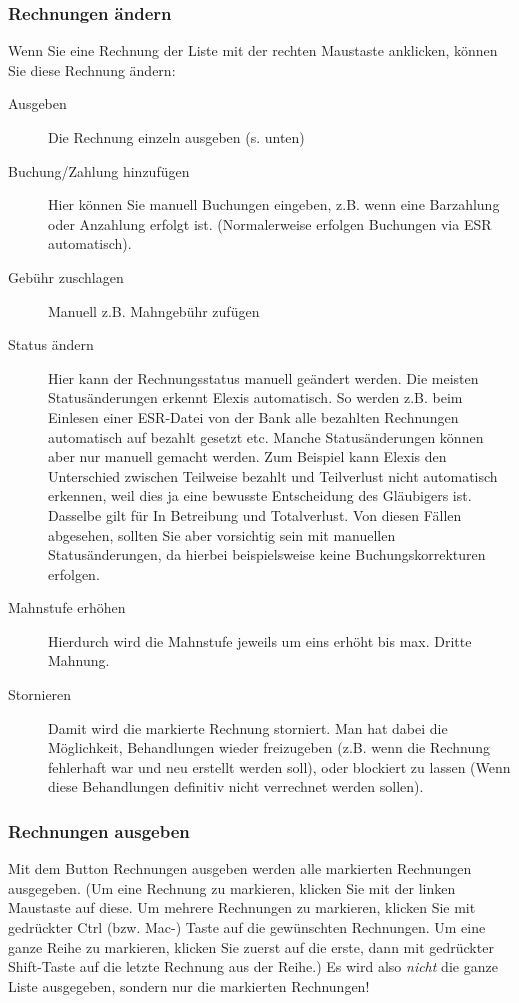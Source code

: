\subsubsection{Rechnungen ändern}
Wenn Sie eine Rechnung der Liste mit der rechten Maustaste anklicken, können Sie diese Rechnung ändern:
\begin{description}
\item [Ausgeben] Die Rechnung einzeln ausgeben (s. unten)
\item [Buchung/Zahlung hinzufügen] Hier können Sie manuell Buchungen eingeben, z.B. wenn eine Barzahlung oder Anzahlung erfolgt ist. (Normalerweise erfolgen Buchungen via ESR automatisch).
\item [Gebühr zuschlagen] Manuell z.B. Mahngebühr zufügen
\item [Status ändern] Hier kann der Rechnungsstatus manuell geändert werden. Die meisten Statusänderungen erkennt Elexis automatisch. So werden z.B. beim Einlesen einer ESR-Datei von der Bank alle bezahlten Rechnungen automatisch auf \glqq bezahlt\grqq{} gesetzt etc. Manche Statusänderungen können aber nur manuell gemacht werden. Zum Beispiel kann Elexis den Unterschied zwischen \glqq Teilweise bezahlt\grqq{} und \glqq Teilverlust\grqq{} nicht automatisch erkennen, weil dies ja eine bewusste Entscheidung des Gläubigers ist. Dasselbe gilt für \glqq In Betreibung\grqq{} und \glqq Totalverlust\grqq{}.
    Von diesen Fällen abgesehen, sollten Sie aber vorsichtig sein mit manuellen Statusänderungen, da hierbei beispielsweise keine Buchungskorrekturen erfolgen.
\item [Mahnstufe erhöhen] Hierdurch wird die Mahnstufe jeweils um eins erhöht bis max. Dritte Mahnung.
\item [Stornieren] Damit wird die markierte Rechnung storniert. Man hat dabei die Möglichkeit, Behandlungen wieder freizugeben (z.B. wenn die Rechnung fehlerhaft war und neu erstellt werden soll), oder blockiert zu lassen (Wenn diese Behandlungen definitiv nicht verrechnet werden sollen).
\end{description}

\subsubsection{Rechnungen ausgeben}
Mit dem Button \glqq Rechnungen ausgeben\grqq{} werden alle markierten Rechnungen ausgegeben. (Um eine Rechnung zu markieren, klicken Sie mit der linken Maustaste auf diese. Um mehrere Rechnungen zu markieren, klicken Sie mit gedrückter Ctrl (bzw. Mac-) Taste auf die gewünschten Rechnungen. Um eine ganze Reihe zu markieren, klicken Sie zuerst auf die erste, dann mit gedrückter Shift-Taste auf die letzte Rechnung aus der Reihe.) Es wird also \textit{nicht} die ganze Liste ausgegeben, sondern nur die markierten Rechnungen!


